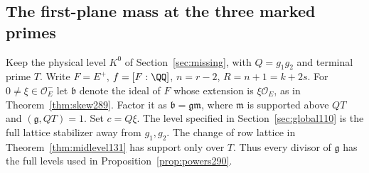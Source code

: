 \documentclass[a4paper,11pt]{article}
\theoremstyle{definition}
\theoremstyle{remark}
\numberwithin{equation}{section}
\begin{document}
\subsection{The first-plane mass at the three marked primes}\label{nav:II-63}
Keep the physical level \(K^0\) of Section~\ref{sec:missing}, with
\(Q=g_1g_2\) and terminal prime \(T\). Write \(F=E^+\),
\(f=[F:\QQ]\), \(n=r-2\), \(R=n+1=k+2s\).
For \(0\ne\xi\in\mathcal O_E^-\) let \(\mathfrak b\) denote
the ideal of \(F\) whose extension is \(\xi\mathcal O_E\), as
in Theorem~\ref{thm:skew289}. Factor it as
\(\mathfrak b=\mathfrak g\mathfrak m\), where \(\mathfrak m\)
is supported above \(QT\) and \((\mathfrak g,QT)=1\).
Set \(c=Q\xi\). The level specified in Section~\ref{sec:global110}
is the full lattice stabilizer away from \(g_1,g_2\).
The change of row lattice in Theorem~\ref{thm:midlevel131}
has support only over \(T\). Thus every divisor of
\(\mathfrak g\) has the full levels used in
Proposition~\ref{prop:powers290}.
\end{document}
